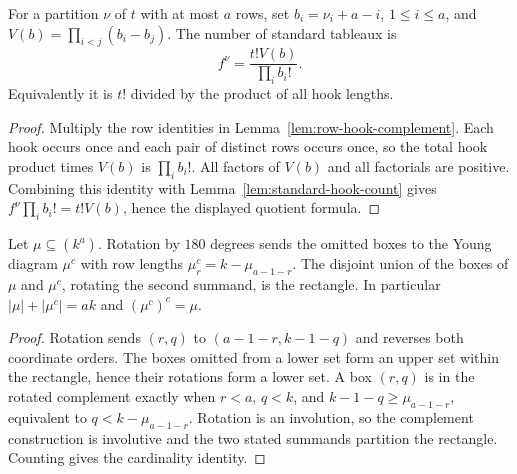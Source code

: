 \begin{lemma}
\label{lem:tableau-count}
\leanok
For a partition $\nu$ of $t$ with at most $a$ rows, set
$b_i=\nu_i+a-i$, $1\leq i\leq a$, and
$V(b)=\prod_{i<j}(b_i-b_j)$. The number of standard tableaux is
\[
 f^\nu=\frac{t!V(b)}{\prod_i b_i!}.
\]
Equivalently it is $t!$ divided by the product of all hook lengths.
\end{lemma}
\begin{proof}
Multiply the row identities in Lemma~\ref{lem:row-hook-complement}.
Each hook occurs once and each pair of distinct rows occurs once,
so the total hook product times $V(b)$ is $\prod_i b_i!$.
All factors of $V(b)$ and all factorials are positive. Combining
this identity with Lemma~\ref{lem:standard-hook-count} gives
$f^\nu\prod_i b_i!=t!V(b)$, hence the displayed quotient formula.
\end{proof}

\begin{lemma}
\label{lem:rectangle-complement}
\leanok
Let $\mu\subseteq(k^a)$. Rotation by $180$ degrees sends the omitted
boxes to the Young diagram $\mu^c$ with row lengths
$\mu^c_r=k-\mu_{a-1-r}$. The disjoint union of the boxes of $\mu$
and $\mu^c$, rotating the second summand, is the rectangle.
In particular $|\mu|+|\mu^c|=ak$ and $(\mu^c)^c=\mu$.
\end{lemma}
\begin{proof}
Rotation sends $(r,q)$ to $(a-1-r,k-1-q)$ and reverses both coordinate
orders. The boxes omitted from a lower set form an upper set within
the rectangle, hence their rotations form a lower set. A box $(r,q)$
is in the rotated complement exactly when $r<a$, $q<k$, and
$k-1-q\geq\mu_{a-1-r}$, equivalent to
$q<k-\mu_{a-1-r}$. Rotation is an involution, so the complement
construction is involutive and the two stated summands partition
the rectangle. Counting gives the cardinality identity.
\end{proof}

